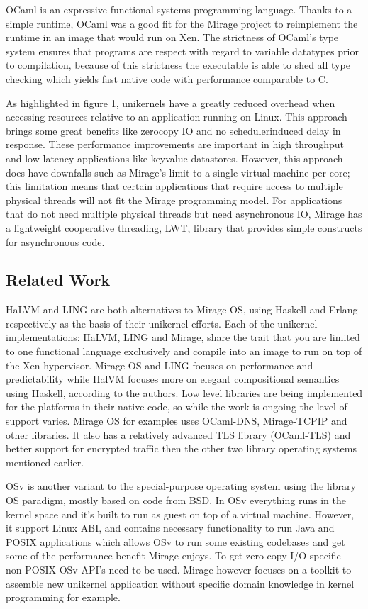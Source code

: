 \documentclass[english,10pt,twocolumn]{article}
\begin{document}
OCaml is an expressive functional systems programming language.
Thanks to a simple runtime, OCaml was a good fit for the Mirage project to reimplement the runtime in an image that would run on Xen.
The strictness of OCaml's type system ensures that programs are respect with regard to variable datatypes prior to compilation, because of this strictness the executable is able to shed all type checking which yields fast native code with performance comparable to C.

As highlighted in figure 1, unikernels have a greatly reduced overhead when accessing resources relative to an application running on Linux.
This approach brings some great benefits like zero\-copy IO and no scheduler\-induced delay in response.
These performance improvements are important in high throughput and low latency applications like key\-value datastores.
However, this approach does have downfalls such as Mirage's limit to a single virtual machine per core; this limitation means that certain applications that require access to multiple physical threads will not fit the Mirage programming model.
For applications that do not need multiple physical threads but need asynchronous IO, Mirage has a lightweight cooperative threading, LWT, library that provides simple constructs for asynchronous code.


\subsection{Related Work}

HaLVM\cite{halvm} and LING\cite{ling} are both alternatives to Mirage OS, using Haskell and Erlang respectively as the basis of their unikernel efforts.
Each of the unikernel implementations: HaLVM, LING and Mirage, share the trait that you are limited to one functional language exclusively and compile into an image to run on top of the Xen hypervisor.
Mirage OS and LING focuses on performance and predictability while HalVM focuses more on elegant compositional semantics using Haskell, according to the authors\cite{tripreport}.
Low level libraries are being implemented for the platforms in their native code, so while the work is ongoing the level of support varies.
Mirage OS for examples uses OCaml-DNS, Mirage-TCPIP and other libraries. It also has a relatively advanced TLS library (OCaml-TLS) and better support for encrypted traffic then the other two library operating systems mentioned earlier.

OSv\cite{osv} is another variant to the special-purpose operating system using the library OS paradigm, mostly based on code from BSD.
In OSv everything runs in the kernel space and it's built to run as guest on top of a virtual machine.
However, it support Linux ABI, and contains necessary functionality to run Java and POSIX applications which allows OSv to run some existing codebases and get some of the performance benefit Mirage enjoys.
To get zero-copy I/O specific non-POSIX OSv API's need to be used.
Mirage however focuses on a toolkit to assemble new unikernel application without specific domain knowledge in kernel programming for example.
\end{document}
